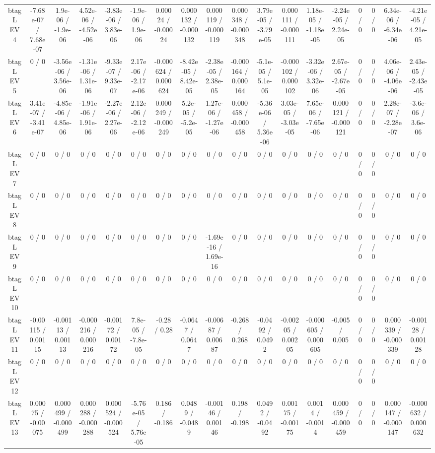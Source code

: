 \documentclass[10pt]{article}
\begin{document}
\begin{table}[htbp]
\begin{center}
\begin{tabular}{|c|c|c|c|c|c|c|c|c|c|c|c|c|c|c|c|c|c|}
  btag L EV 4 & -7.68e-07 / 7.68e-07 & 1.9e-06 / -1.9e-06 & 4.52e-06 / -4.52e-06 & -3.83e-06 / 3.83e-06 & -1.9e-06 / 1.9e-06 & 0.00024 / -0.00024 & 0.000132 / -0.000132 & 0.000119 / -0.000119 & 0.000348 / -0.000348 & 3.79e-05 / -3.79e-05 & 0.000111 / -0.000111 & 1.18e-05 / -1.18e-05 & -2.24e-05 / 2.24e-05 & 0 / 0 & 0 / 0 & 6.34e-06 / -6.34e-06 & -4.21e-05 / 4.21e-05 \\ 
  btag L EV 5 & 0 / 0 & -3.56e-06 / 3.56e-06 & -1.31e-06 / 1.31e-06 & -9.33e-07 / 9.33e-07 & 2.17e-06 / -2.17e-06 & -0.000624 / 0.000624 & -8.42e-05 / 8.42e-05 & -2.38e-05 / 2.38e-05 & -0.000164 / 0.000164 & -5.1e-05 / 5.1e-05 & -0.000102 / 0.000102 & -3.32e-06 / 3.32e-06 & 2.67e-05 / -2.67e-05 & 0 / 0 & 0 / 0 & 4.06e-06 / -4.06e-06 & 2.43e-05 / -2.43e-05 \\ 
  btag L EV 6 & 3.41e-07 / -3.41e-07 & -4.85e-06 / 4.85e-06 & -1.91e-06 / 1.91e-06 & -2.27e-06 / 2.27e-06 & 2.12e-06 / -2.12e-06 & 0.000249 / -0.000249 & 5.2e-05 / -5.2e-05 & 1.27e-06 / -1.27e-06 & 0.000458 / -0.000458 & -5.36e-06 / 5.36e-06 & 3.03e-05 / -3.03e-05 & 7.65e-06 / -7.65e-06 & 0.000121 / -0.000121 & 0 / 0 & 0 / 0 & 2.28e-07 / -2.28e-07 & -3.6e-06 / 3.6e-06 \\ 
  btag L EV 7 & 0 / 0 & 0 / 0 & 0 / 0 & 0 / 0 & 0 / 0 & 0 / 0 & 0 / 0 & 0 / 0 & 0 / 0 & 0 / 0 & 0 / 0 & 0 / 0 & 0 / 0 & 0 / 0 & 0 / 0 & 0 / 0 & 0 / 0 \\ 
  btag L EV 8 & 0 / 0 & 0 / 0 & 0 / 0 & 0 / 0 & 0 / 0 & 0 / 0 & 0 / 0 & 0 / 0 & 0 / 0 & 0 / 0 & 0 / 0 & 0 / 0 & 0 / 0 & 0 / 0 & 0 / 0 & 0 / 0 & 0 / 0 \\ 
  btag L EV 9 & 0 / 0 & 0 / 0 & 0 / 0 & 0 / 0 & 0 / 0 & 0 / 0 & 0 / 0 & -1.69e-16 / 1.69e-16 & 0 / 0 & 0 / 0 & 0 / 0 & 0 / 0 & 0 / 0 & 0 / 0 & 0 / 0 & 0 / 0 & 0 / 0 \\ 
  btag L EV 10 & 0 / 0 & 0 / 0 & 0 / 0 & 0 / 0 & 0 / 0 & 0 / 0 & 0 / 0 & 0 / 0 & 0 / 0 & 0 / 0 & 0 / 0 & 0 / 0 & 0 / 0 & 0 / 0 & 0 / 0 & 0 / 0 & 0 / 0 \\ 
  btag L EV 11 & -0.00115 / 0.00115 & -0.00113 / 0.00113 & -0.000216 / 0.000216 & -0.00172 / 0.00172 & 7.8e-05 / -7.8e-05 & -0.28 / 0.28 & -0.0647 / 0.0647 & -0.00687 / 0.00687 & -0.268 / 0.268 & -0.0492 / 0.0492 & -0.00205 / 0.00205 & -0.000605 / 0.000605 & -0.005 / 0.005 & 0 / 0 & 0 / 0 & 0.000339 / -0.000339 & -0.00128 / 0.00128 \\ 
  btag L EV 12 & 0 / 0 & 0 / 0 & 0 / 0 & 0 / 0 & 0 / 0 & 0 / 0 & 0 / 0 & 0 / 0 & 0 / 0 & 0 / 0 & 0 / 0 & 0 / 0 & 0 / 0 & 0 / 0 & 0 / 0 & 0 / 0 & 0 / 0 \\ 
  btag L EV 13 & 0.00075 / -0.00075 & 0.000499 / -0.000499 & 0.000288 / -0.000288 & 0.000524 / -0.000524 & -5.76e-05 / 5.76e-05 & 0.186 / -0.186 & 0.0489 / -0.0489 & -0.00146 / 0.00146 & 0.198 / -0.198 & 0.0492 / -0.0492 & 0.00175 / -0.00175 & 0.0014 / -0.0014 & 0.000459 / -0.000459 & 0 / 0 & 0 / 0 & 0.000147 / -0.000147 & -0.000632 / 0.000632 \\ 

\end{tabular}
\end{center}
\end{table}
\end{document}
